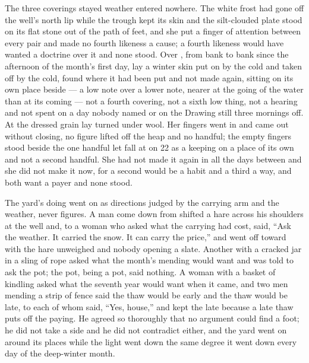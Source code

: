 The three coverings stayed weather entered nowhere. The white frost had gone off the well's north lip while the trough kept its skin and the silt-clouded plate stood on its flat stone out of the path of feet, and she put a finger of attention between every pair and made no fourth likeness a cause; a fourth likeness would have wanted a doctrine over it and none stood. Over , from bank to bank since the afternoon of the month's first day, lay a winter skin put on by the cold and taken off by the cold, found where it had been put and not made again, sitting on its own place beside  — a low note over a lower note, nearer at the going of the water than at its coming — not a fourth covering, not a sixth low thing, not a hearing and not spent on a day nobody named or on the Drawing still three mornings off. At  the dressed grain lay turned under wool. Her fingers went in and came out without closing, no figure lifted off the heap and no handful; the empty fingers stood beside the one handful let fall at  on  22 as a keeping on a place of its own and not a second handful. She had not made it again in all the days between and she did not make it now, for a second would be a habit and a third a way, and both want a payer and none stood.

The yard's doing went on as directions judged by the carrying arm and the weather, never figures. A man come down from  shifted a hare across his shoulders at the well and, to a woman who asked what the carrying had cost, said, “Ask the weather. It carried the snow. It can carry the price,” and went off toward  with the hare unweighed and nobody opening a slate. Another with a cracked jar in a sling of rope asked what the month's mending would want and was told to ask the pot; the pot, being a pot, said nothing. A woman with a basket of kindling asked what the seventh year would want when it came, and two men mending a strip of fence said the thaw would be early and the thaw would be late, to each of whom  said, “Yes, house,” and kept the late because a late thaw puts off the paying. He agreed so thoroughly that no argument could find a foot; he did not take a side and he did not contradict either, and the yard went on around its places while the light went down the same degree it went down every day of the deep-winter month.

